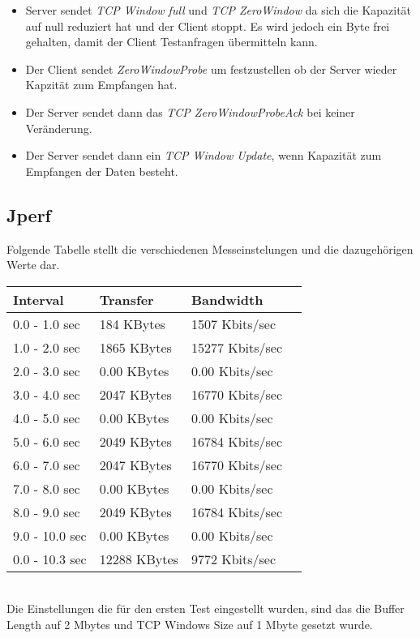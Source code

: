 \documentclass{scrartcl}
\begin{document}
    \begin{itemize}
    \item
    Server sendet \textit{TCP Window full} und \textit{TCP ZeroWindow} da sich die Kapazität auf null reduziert hat und der Client stoppt. Es wird jedoch ein Byte frei gehalten, damit der Client Testanfragen übermitteln kann.

\item
  Der Client sendet \textit{ZeroWindowProbe} um festzustellen ob der Server wieder Kapzität zum Empfangen hat.

\item
Der Server sendet dann das \textit{TCP ZeroWindowProbeAck} bei keiner Veränderung. 
    
\item
Der Server sendet dann ein \textit{TCP Window Update}, wenn Kapazität zum Empfangen der Daten besteht. 
 \end{itemize}   
        
   \subsection[Aufgabe 8 Jperf]{Jperf}
   
   Folgende Tabelle stellt die verschiedenen Messeinstelungen und die dazugehörigen Werte dar.
         \begin{table}[htbp]
   \centering
  \begin{tabular}{|llll|}
\textbf{Interval} & \textbf{Transfer} &\textbf{Bandwidth}\\ \hline
0.0 - 1.0 sec & 184 KBytes & 1507 Kbits/sec\\
1.0 - 2.0 sec & 1865 KBytes & 15277 Kbits/sec \\
2.0 - 3.0 sec & 0.00 KBytes & 0.00 Kbits/sec\\
3.0 - 4.0 sec & 2047 KBytes & 16770 Kbits/sec\\
4.0 - 5.0 sec & 0.00 KBytes & 0.00 Kbits/sec\\
5.0 - 6.0 sec & 2049 KBytes & 16784 Kbits/sec\\
6.0 - 7.0 sec & 2047 KBytes & 16770 Kbits/sec\\
7.0 - 8.0 sec & 0.00 KBytes & 0.00 Kbits/sec\\
8.0 - 9.0 sec & 2049 KBytes & 16784 Kbits/sec\\
9.0 - 10.0 sec & 0.00 KBytes & 0.00 Kbits/sec\\
0.0 - 10.3 sec & 12288 KBytes & 9772 Kbits/sec\\
    \end{tabular}
    \label{tab:tcp}
   \end{table}\\
   Die Einstellungen die für den ersten Test eingestellt wurden, sind das die Buffer Length auf 2 Mbytes und TCP Windows Size auf 1 Mbyte gesetzt wurde.
\end{document}
